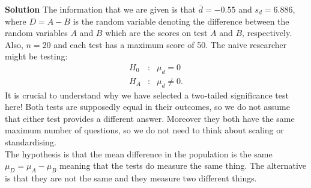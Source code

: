\begin{enumerate}
\begin{enumerate}
        \begin{framed}{\textbf{Solution}}
        The information that we are given is that $\bar{d} = -0.55$ and $s_d = 6.886$, where $D = A - B$ is the random variable denoting the difference between the random variables $A$ and $B$ which are the scores on test $A$ and $B$, respectively. Also, $n=20$ and each test has a maximum score of 50. The naive researcher might be testing:
        \[
            \begin{matrix}
            H_0 & : & \mu_d = 0 \\
            H_A & : & \mu_d \ne 0.
            \end{matrix}
        \]
        It is crucial to understand why we have selected a two-tailed significance test here! Both tests are supposedly equal in their outcomes, so we do not assume that either test provides a different answer. Moreover they both have the same maximum number of questions, so we do not need to think about scaling or standardising. \\
        The hypothesis is that the mean difference in the population is the same $\mu_D= \mu_A - \mu_B$ meaning that the tests do measure the same thing. The alternative is that they are not the same and they measure two different things.
        \end{framed}
        

\end{enumerate}
\end{enumerate}
